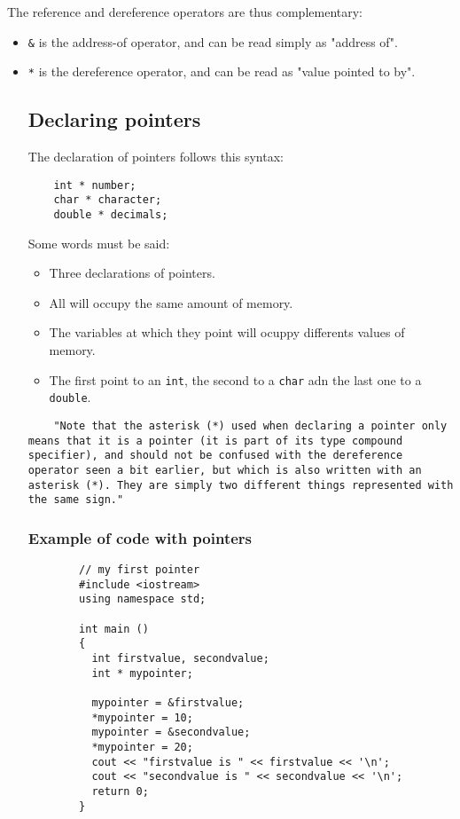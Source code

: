 \documentclass[12pt]{article}
\begin{document}
	The reference and dereference operators are thus complementary:
	\begin{itemize}
	\item \verb|&| is the address-of operator, and can be read simply as "address of".
	\item \verb|*| is the dereference operator, and can be read as "value pointed to by". 

	\subsection{Declaring pointers}

	The declaration of pointers follows this syntax: 

	\begin{verbatim}
	int * number; 
	char * character; 
	double * decimals; 
	\end{verbatim}

	Some words must be said: 
	\begin{itemize}
	\item Three declarations of pointers.
	\item All will occupy the same amount of memory.
	\item The variables at which they point will ocuppy differents values of memory.
	\item The first point to an \verb|int|, the second to a \verb|char| adn the last one to a \verb|double|. 
	\end{itemize}

	\begin{verbatim}
	"Note that the asterisk (*) used when declaring a pointer only means that it is a pointer (it is part of its type compound specifier), and should not be confused with the dereference operator seen a bit earlier, but which is also written with an asterisk (*). They are simply two different things represented with the same sign."
	\end{verbatim}

		\subsubsection{Example of code with pointers}

		\begin{verbatim} 
		// my first pointer
		#include <iostream>
		using namespace std;

		int main ()
		{
		  int firstvalue, secondvalue;
		  int * mypointer;

		  mypointer = &firstvalue;
		  *mypointer = 10;
		  mypointer = &secondvalue;
		  *mypointer = 20;
		  cout << "firstvalue is " << firstvalue << '\n';
		  cout << "secondvalue is " << secondvalue << '\n';
		  return 0;
		}
		\end{verbatim}


\end{itemize}
\end{document}
